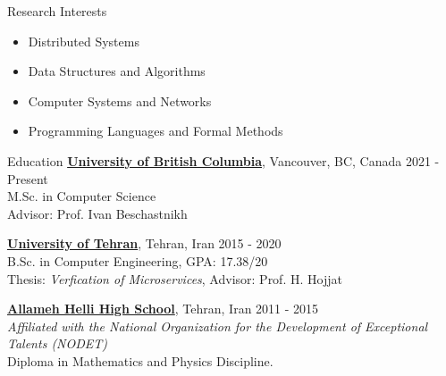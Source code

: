 \documentclass{resume} %
\begin{document}
	

\begin{rSection}{Research Interests}
	\begin{multicols}{2}
		\begin{itemize}[leftmargin=0mm]
			\item Distributed Systems
			\item Data Structures and Algorithms
			\item Computer Systems and Networks
			\item Programming Languages and Formal Methods
		\end{itemize}
	\end{multicols}
\end{rSection}


\begin{rSection}{Education}
	{\bf \href{https://www.ubc.ca/}{University of British Columbia}}, Vancouver, BC, Canada \hfill 2021 - Present
	\\M.Sc. in Computer Science
	\\Advisor: Prof. Ivan Beschastnikh
	
	{\bf \href{http://ut.ac.ir/en}{University of Tehran}}, Tehran, Iran \hfill 2015 - 2020 
	\\B.Sc. in Computer Engineering, GPA: 17.38/20 
    \\Thesis: \textit{Verfication of Microservices}, Advisor: Prof. H. Hojjat
	
	{\bf \href{http://www.helli.ir/}{Allameh Helli High School}}, Tehran, Iran \hfill 2011 - 2015
	\\\textit{\scriptsize Affiliated with the National Organization for the Development of Exceptional Talents (NODET)}
	\\Diploma in Mathematics and Physics Discipline.
	
\end{rSection}

\end{document}
